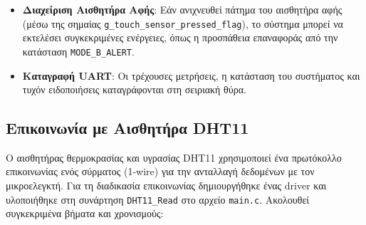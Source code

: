 \documentclass{article}
\begin{document}
\begin{enumerate}
\begin{itemize}
\begin{itemize}
        \end{itemize}
        \item \textbf{Διαχείριση Αισθητήρα Αφής}: Εάν ανιχνευθεί πάτημα του αισθητήρα αφής (μέσω της σημαίας \texttt{g\_touch\_sensor\_pressed\_flag}), το σύστημα μπορεί να εκτελέσει συγκεκριμένες ενέργειες, όπως η προσπάθεια επαναφοράς από την κατάσταση \texttt{MODE\_B\_ALERT}.
        \item \textbf{Καταγραφή UART}: Οι τρέχουσες μετρήσεις, η κατάσταση του συστήματος και τυχόν ειδοποιήσεις καταγράφονται στη σειριακή θύρα.
    \end{itemize}
\end{enumerate}

\subsection{Επικοινωνία με Αισθητήρα DHT11}
\label{subsec:dht11_communication}
Ο αισθητήρας θερμοκρασίας και υγρασίας DHT11 χρησιμοποιεί ένα πρωτόκολλο επικοινωνίας ενός σύρματος (1-wire) για την ανταλλαγή δεδομένων με τον μικροελεγκτή. Για τη διαδικασία επικοινωνίας δημιουργήθηκε ένας driver και υλοποιήθηκε στη συνάρτηση \texttt{DHT11\_Read} στο αρχείο \texttt{main.c}. Ακολουθεί συγκεκριμένα βήματα και χρονισμούς:
\end{document}

